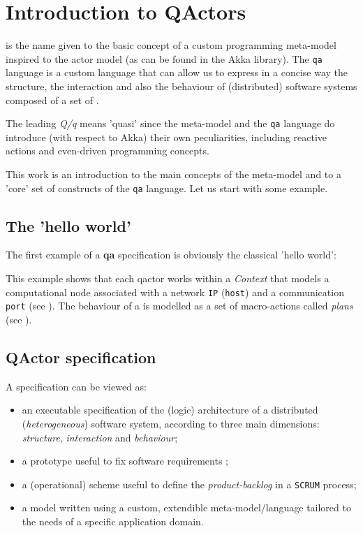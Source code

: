 \section{Introduction to QActors}

\qa{} is the name given to the basic concept of a custom programming meta-model inspired to the actor model (as can be found in the Akka library). The \texttt{qa} language is a custom language that can allow us to express in a concise way the structure, the interaction and also the behaviour of (distributed) software systems composed of a set of \qa{}.

The leading \textit{Q/q} means 'quasi' since the \qa{} meta-model and the \texttt{qa} language do introduce (with respect to Akka) their own peculiarities, including reactive actions and even-driven programming concepts.

This work is an introduction to the main concepts of the \qa{} meta-model and to a 'core' set of constructs of the \texttt{qa} language. Let us start with some example.

\subsection{The 'hello world'}
The first example of a \textbf{qa} specification is obviously the classical 'hello world':



This example shows that each qactor works within a \textit{Context} that models a computational node associated with a network \texttt{IP} (\texttt{host}) and a communication \texttt{port} (see ). The behaviour of a is modelled as a set of macro-actions called \textit{plans} (see ).

\subsection{QActor specification}

A  \qa{} specification can be viewed as:
\begin{itemize}
\item an executable specification of the (logic) architecture of a distributed (\textit{heterogeneous}) software system, according to three main dimensions: \textit{structure}, \textit{interaction} and \textit{behaviour};
\item a prototype useful to fix software requirements ;
\item a (operational) scheme useful to define the \textit{product-backlog} in a \texttt{SCRUM} process;
\item a model written using a custom, extendible meta-model/language tailored to the needs of a specific application domain.
\end{itemize}

